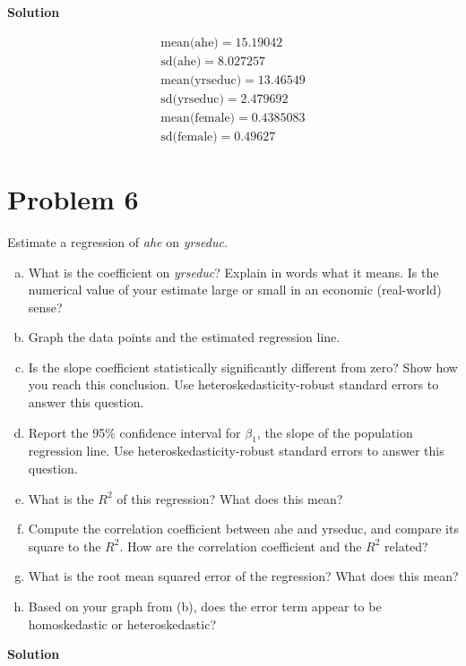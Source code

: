 \documentclass[a4paper]{article}
\begin{document}
\textbf{Solution}


\begin{align*}
\text{mean(ahe)} = 15.19042\\
\text{sd(ahe)} = 8.027257\\
\text{mean(yrseduc)} = 13.46549\\
\text{sd(yrseduc)} = 2.479692\\
\text{mean(female)} = 0.4385083\\
\text{sd(female)} = 0.49627
\end{align*}
\section*{Problem 6}
 Estimate a regression of \textit{ahe} on \textit{yrseduc}.
 \begin{enumerate}[a.]
 	\item What is the coefficient on \textit{yrseduc}? Explain in words what it means. Is the numerical
value of your estimate large or small in an economic (real-world) sense?
\item Graph the data points and the estimated regression line.
\item Is the slope coefficient statistically significantly different from zero? Show how you reach
this conclusion. Use heteroskedasticity-robust standard errors to answer this question.
\item Report the 95\% confidence interval for $\beta_1$, the slope of the population regression line.
Use heteroskedasticity-robust standard errors to answer this question.
\item  What is the $R^2$ of this regression? What does this mean?
\item  Compute the correlation coefficient between ahe and yrseduc, and compare its square to
the $R^2$. How are the correlation coefficient and the $R^2$
related?
\item What is the root mean squared error of the regression? What does this mean?
\item Based on your graph from (b), does the error term appear to be homoskedastic or
heteroskedastic?

\end{enumerate}


\textbf{Solution}
\end{document}
